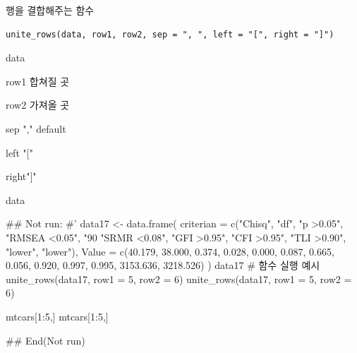 \documentclass[a4paper]{book}
\begin{document}
%
\begin{Description}
행을 결합해주는 함수
\end{Description}
%
\begin{Usage}
\begin{verbatim}
unite_rows(data, row1, row2, sep = ", ", left = "[", right = "]")
\end{verbatim}
\end{Usage}
%
\begin{Arguments}
\begin{ldescription}
\item[\code{data}] data

\item[\code{row1}] row1 합쳐질 곳

\item[\code{row2}] row2 가져올 곳

\item[\code{sep}] sep "," default

\item[\code{left}] left "["

\item[\code{right}] right"]"
\end{ldescription}
\end{Arguments}
%
\begin{Value}
data
\end{Value}
%
\begin{Examples}
\begin{ExampleCode}

## Not run: 
#'
data17 <- data.frame(
  criterian = c("Chisq", "df", "p >0.05", "RMSEA <0.05",
                "90%
                "SRMR <0.08", "GFI >0.95", "CFI >0.95", "TLI >0.90", "lower", "lower"),
  Value = c(40.179, 38.000, 0.374, 0.028, 0.000, 0.087,
            0.665, 0.056, 0.920, 0.997, 0.995, 3153.636, 3218.526)
)
data17
# 함수 실행 예시
unite_rows(data17, row1 = 5, row2 = 6)
unite_rows(data17, row1 = 5, row2 = 6)%

mtcars[1:5,]
mtcars[1:5,] %

## End(Not run)



\end{ExampleCode}
\end{Examples}
%
\end{document}
